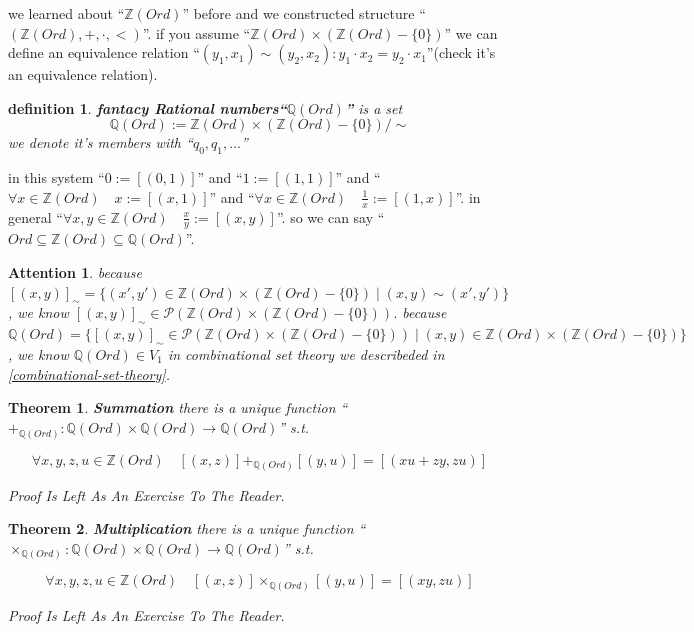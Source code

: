 \documentclass[10pt,a4paper]{book}
\newtheorem{definition}{definition}[section]
\newtheorem{theorem}{Theorem}[section]
\newtheorem{Attention}{Attention}[section]
\begin{document}
we learned about ``$\mathbb{Z} (Ord)$'' before and we constructed structure
``$(\mathbb{Z} (Ord) , + , \cdot , <)$''. if you assume ``$\mathbb{Z} (Ord)
    \times (\mathbb{Z} (Ord) - \{0\})$'' we can define an equivalence relation ``$
    (y_1 , x_1 ) \sim (y_2 , x_2 ) : y_1 \cdot x_2 = y_2 \cdot x_1 $''(check it's
an equivalence relation).

\begin{definition}\textbf{fantacy Rational numbers``$\mathbb{Q} (Ord)$''} is a set
    \[ \mathbb{Q} (Ord) := \mathbb{Z} (Ord) \times (\mathbb{Z} (Ord) - \{0\}) / \sim\]
    we denote it's members with ``$q_0 , q_1 ,...$''
\end{definition}




in this system ``$ 0 := [(0,1)]$'' and ``$ 1 := [(1,1)]$'' and ``$ \forall x
    \in \mathbb{Z} (Ord) \quad x := [(x,1)]$'' and ``$\forall x \in \mathbb{Z}
    (Ord) \quad \frac{1}{x} := [(1,x)]$''. in general ``$\forall x,y \in \mathbb{Z}
    (Ord) \quad \frac{x}{y} := [(x,y)]$''. so we can say ``$ Ord \subseteq
    \mathbb{Z} (Ord) \subseteq \mathbb{Q} (Ord) $''.




\begin{Attention} because $[(x , y)]_\sim = \{ (x' , y') \in \mathbb{Z} (Ord) \times (\mathbb{Z} (Ord) - \{0\}) \mid (x , y) \sim (x' , y') \}$,
    we know  $[(x , y)]_\sim \in \mathcal{P} ( \mathbb{Z} (Ord) \times (\mathbb{Z} (Ord) - \{ 0 \}))$.
    because $ \mathbb{Q} (Ord) = \{ [(x , y)]_\sim \in \mathcal{P} ( \mathbb{Z} (Ord) \times (\mathbb{Z} (Ord) - \{ 0 \})) \mid (x , y) \in \mathbb{Z} (Ord) \times (\mathbb{Z} (Ord) - \{0\}) \}$,
    we know  $\mathbb{Q} (Ord) \in V_1$
    in combinational set theory we describeded in \ref{combinational-set-theory}.
\end{Attention}

\begin{theorem}\textbf{Summation} there is a unique function ``$+_{\mathbb{Q} (Ord)} :\mathbb{Q} (Ord) \times \mathbb{Q} (Ord) \to \mathbb{Q} (Ord)$'' s.t.

    \[ \forall x  , y  , z , u  \in \mathbb{Z} (Ord) \quad [(x  , z)] +_{\mathbb{Q} (Ord)} [(y  , u)]  = [(x u  + z y ,  z  u)] \]

    Proof Is Left As An Exercise To The Reader.
\end{theorem}

\begin{theorem}\textbf{Multiplication} there is a unique function ``$\times_{\mathbb{Q} (Ord)} :\mathbb{Q} (Ord) \times \mathbb{Q} (Ord) \to \mathbb{Q} (Ord)$'' s.t.

    \[ \forall x  , y  , z , u  \in \mathbb{Z} (Ord) \quad [(x  , z)] \times_{\mathbb{Q} (Ord)} [(y  , u)]  = [(x  y , z u)] \]

    Proof Is Left As An Exercise To The Reader.
\end{theorem}
\end{document}
